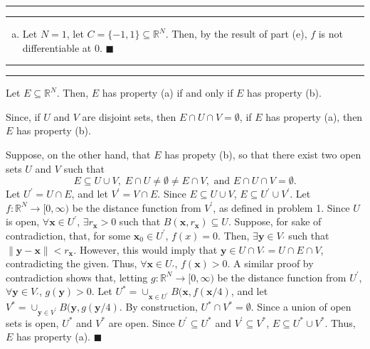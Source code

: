\documentclass[11pt]{article}
\newcounter{questionCounter}
\newcounter{partCounter}[questionCounter]
\newenvironment{question}[2][\arabic{questionCounter}]{%
    \setcounter{partCounter}{0}%
    \vspace{.25in} \hrule \vspace{0.5em}%
        \noindent{\bf #2}%
    \vspace{0.8em} \hrule \vspace{.10in}%
    \addtocounter{questionCounter}{1}%
}{}
\begin{document}
\begin{question}{Problem 1}
\begin{enumerate}[(a)]
\item Let $N = 1$, let $C = \{-1, 1\} \subseteq \mathbb{R}^N$. Then, by the
result of part (e), $f$ is not differentiable at $0$. \qquad $\blacksquare$

\end{enumerate}
\end{question}

\begin{question}{Problem 2}
Let $E \subseteq \mathbb{R}^N$. Then, $E$ has property (a) if and only if $E$
has property (b).

Since, if $U$ and $V$ are disjoint sets, then $E \cap U \cap V = \emptyset$,
if $E$ has property (a), then $E$ has property (b).

Suppose, on the other hand, that $E$ has propety (b), so that there exist two
open sets  $U$ and $V$ such that
\[E \subseteq U \cup V, \; E \cap U \neq \emptyset \neq E \cap V, \mbox{ and }
E \cap U \cap V = \emptyset.\]
Let $U^{\prime} = U \cap E$, and let $V^{\prime} = V \cap E$. Since
$E \subseteq U \cup V$, $E \subseteq U^{\prime} \cup V^{\prime}$.
Let $f: \mathbb{R}^N \rightarrow [0,\infty)$ be the distance function from
$V^{\prime}$, as defined in problem 1. Since $U$ is open, $\forall
\mathbf{x} \in U^{\prime}$, $\exists r_{\mathbf{x}} > 0$ such that
$B(\mathbf{x},r_{\mathbf{x}}) \subseteq U$. Suppose, for sake of
contradiction, that, for some $\mathbf{x}_0 \in U^{\prime}$, $f(x) = 0$. Then,
$\exists \mathbf{y} \in V_{\prime}$ such that $\|\mathbf{y} - \mathbf{x}\|
 < r_{\mathbf{x}}$. However, this would imply that
$\mathbf{y} \in U \cap V_{\prime} = U \cap E \cap V$, contradicting the given.
Thus, $\forall \mathbf{x} \in U_{\prime}$, $f(\mathbf{x}) > 0$. A similar
proof by contradiction shows that, letting
$g: \mathbb{R}^N \rightarrow [0,\infty)$ be the distance function from
$U^{\prime}$, $\forall \mathbf{y} \in V_{\prime}$, $g(\mathbf{y}) > 0$. Let
$U^* = \cup_{\mathbf{x} \in U^{\prime}} B(\mathbf{x}, f(\mathbf{x}/4)$, and let
$V^* = \cup_{\mathbf{y} \in V^{\prime}} B(\mathbf{y}, g(\mathbf{y}/4)$. By
construction, $U^* \cap V^* = \emptyset$. Since a union of open sets is open,
$U^*$ and $V^*$ are open. Since $U^{\prime} \subseteq U^*$ and
$V^{\prime} \subseteq V^*$, $E \subseteq U^* \cup V^*$. Thus, $E$ has property
(a). \qquad $\blacksquare$
\end{question}
\end{document}

